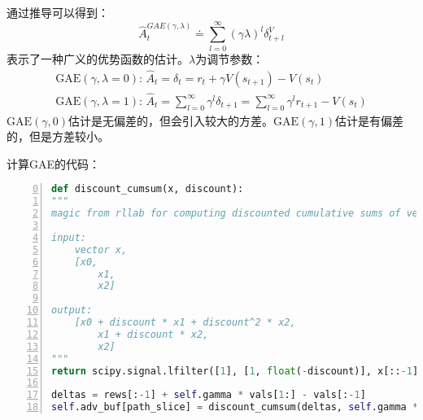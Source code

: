 通过推导可以得到：
\begin{equation*}
    \hat{A}_t^{GAE(\gamma,\lambda)} \doteq \sum_{l=0}^\infty (\gamma \lambda)^l \delta_{t+l}^V
\end{equation*}
表示了一种广义的优势函数的估计。$\lambda$为调节参数：
\begin{gather*}
    \text{GAE}(\gamma,\lambda=0):\, \hat{A}_t = \delta_t = r_t + \gamma V(s_{t+1}) - V(s_t) \\
    \text{GAE}(\gamma,\lambda=1):\, \hat{A}_t = \sum_{l=0}^\infty \gamma^l \delta_{t+1} = \sum_{l=0}^\infty \gamma^l r_{t+1} - V(s_t)
\end{gather*}
$\text{GAE}(\gamma,0)$估计是无偏差的，但会引入较大的方差。$\text{GAE}(\gamma,1)$估计是有偏差的，但是方差较小。

计算GAE的代码：
\begin{lstlisting}[language=python,numbers=left,firstnumber = 0,numberstyle=\tiny,breaklines = true,keywordstyle=\color{blue!70},commentstyle=\color{red!50!green!50!blue!50},frame=shadowbox, rulesepcolor=\color{red!20!green!20!blue!20}]
def discount_cumsum(x, discount):
"""
magic from rllab for computing discounted cumulative sums of vectors.

input: 
    vector x, 
    [x0, 
        x1, 
        x2]

output:
    [x0 + discount * x1 + discount^2 * x2,  
        x1 + discount * x2,
        x2]
"""
return scipy.signal.lfilter([1], [1, float(-discount)], x[::-1], axis=0)[::-1]

deltas = rews[:-1] + self.gamma * vals[1:] - vals[:-1]
self.adv_buf[path_slice] = discount_cumsum(deltas, self.gamma * self.lam)
\end{lstlisting}

